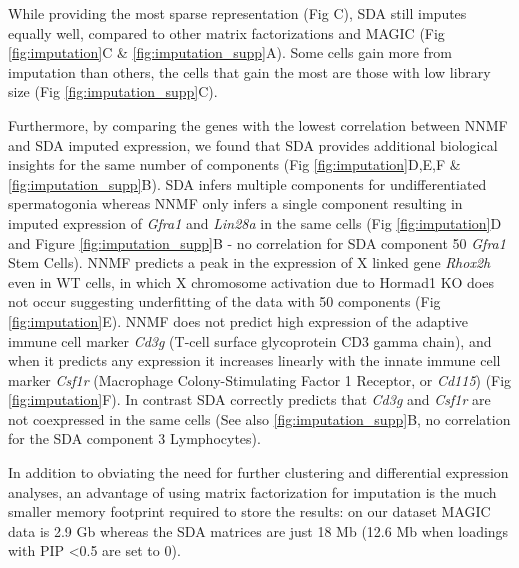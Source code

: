 While providing the most sparse representation (Fig \label{fig:SDA}C), SDA still imputes equally well, compared to other matrix factorizations and MAGIC \parencite{vanDijk2018Recovering} (Fig \ref{fig:imputation}C \& \ref{fig:imputation_supp}A). Some cells gain more from imputation than others, the cells that gain the most are those with low library size (Fig \ref{fig:imputation_supp}C).

Furthermore, by comparing the genes with the lowest correlation between NNMF and SDA imputed expression, we found that SDA provides additional biological insights for the same number of components (Fig \ref{fig:imputation}D,E,F \& \ref{fig:imputation_supp}B). SDA infers multiple components for undifferentiated spermatogonia whereas NNMF only infers a single component resulting in imputed expression of \textit{Gfra1} and \textit{Lin28a} in the same cells (Fig \ref{fig:imputation}D and Figure \ref{fig:imputation_supp}B - no correlation for SDA component 50 \textit{Gfra1} Stem Cells). NNMF predicts a peak in the expression of X linked gene \textit{Rhox2h} even in WT cells, in which X chromosome activation due to Hormad1 KO does not occur suggesting underfitting of the data with 50 components (Fig \ref{fig:imputation}E). NNMF does not predict high expression of the adaptive immune cell marker \textit{Cd3g} (T-cell surface glycoprotein CD3 gamma chain), and when it predicts any expression it increases linearly with the innate immune cell marker \textit{Csf1r} (Macrophage Colony-Stimulating Factor 1 Receptor, or \textit{Cd115}) (Fig \ref{fig:imputation}F). In contrast SDA correctly predicts that \textit{Cd3g} and \textit{Csf1r} are not coexpressed in the same cells (See also \ref{fig:imputation_supp}B, no correlation for the SDA component 3 Lymphocytes).

In addition to obviating the need for further clustering and differential expression analyses, an advantage of using matrix factorization for imputation is the much smaller memory footprint required to store the results: on our dataset MAGIC data is 2.9 Gb whereas the SDA matrices are just 18 Mb (12.6 Mb when loadings with PIP <0.5 are set to 0).


